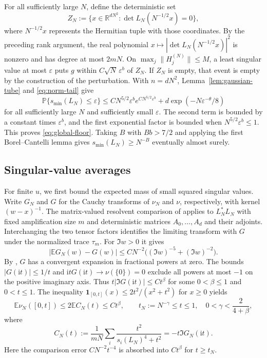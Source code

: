 For all sufficiently large $N$, define the deterministic set
\[
 Z_N:=\{x\in\mathbb R^{dN^2}:\det L_N(N^{-1/2}x)=0\},
\]
where $N^{-1/2}x$ represents the Hermitian tuple with those coordinates.
By the preceding rank argument, the real polynomial $x\mapsto|\det L_N(N^{-1/2}x)|^2$ is nonzero and has degree at most $2mN$.
On $\max_j\|H_j^{(N)}\|\le M$, a least singular value at most $\varepsilon$ puts $g$ within $C\sqrt N\,\varepsilon^b$ of $Z_N$.
If $Z_N$ is empty, that event is empty by the construction of the perturbation.
With $n=dN^2$, Lemma~\ref{lem:gaussian-tube} and \eqref{eq:norm-tail} give
\[
 \mathbb P\{s_{\min}(L_N)\le\varepsilon\}
 \le C N^{5/2}\varepsilon^b e^{C N^{5/2}\varepsilon^b}
     +d\exp(-N\varepsilon^{-\theta}/8)
\]
for all sufficiently large $N$ and sufficiently small $\varepsilon$.
The second term is bounded by a constant times $\varepsilon^b$, and the first exponential factor is bounded when $N^{5/2}\varepsilon^b\le 1$.
This proves \eqref{eq:global-floor}.
Taking $B$ with $Bb>7/2$ and applying the first Borel--Cantelli lemma gives $s_{\min}(L_N)\ge N^{-B}$ eventually almost surely.

\subsection{Singular-value averages}\label{subsec:affine-counting}

For finite $u$, we first bound the expected mass of small squared singular values.
Write $G_N$ and $G$ for the Cauchy transforms of $\nu_N$ and $\nu$, respectively, with kernel $(w-x)^{-1}$.
The matrix-valued resolvent comparison of \cite[Corollary~1.3 of arXiv v1]{CGP22} applies to $L_N^*L_N$ with fixed amplification size $m$ and deterministic matrices $A_0,\ldots,A_d$ and their adjoints.
Interchanging the two tensor factors identifies the limiting transform with $G$ under the normalized trace $\tau_m$.
For $\Im w>0$ it gives
\[
 |\mathbb E G_N(w)-G(w)|\le C N^{-2}\bigl((\Im w)^{-5}+(\Im w)^{-2}\bigr).
\]
By \cite[Theorem~1.1(5)--(6)]{SS15}, $G$ has a convergent expansion in fractional powers at zero.
The bounds $|G(\mathrm{i}t)|\le 1/t$ and $\mathrm{i}tG(\mathrm{i}t)\to\nu(\{0\})=0$ exclude all powers at most $-1$ on the positive imaginary axis.
Thus $t|\Im G(\mathrm{i}t)|\le Ct^\beta$ for some $0<\beta\le1$ and $0<t\le1$.
The inequality $\mathbf 1_{[0,t]}(x)\le 2t^2/(x^2+t^2)$ for $x\ge0$ yields
\begin{equation}\label{eq:affine-count}
 \mathbb E\nu_N([0,t])\le 2\mathbb E C_N(t)
 \le C t^\beta,\qquad
 t_N:=N^{-\gamma}\le t\le1,\quad 0<\gamma<\frac{2}{4+\beta},
\end{equation}
where
\[
 C_N(t):=\frac1{mN}\sum_i\frac{t^2}{s_i(L_N)^4+t^2}
        =-t\Im G_N(\mathrm{i}t).
\]
Here the comparison error $CN^{-2}t^{-4}$ is absorbed into $Ct^\beta$ for $t\ge t_N$.

